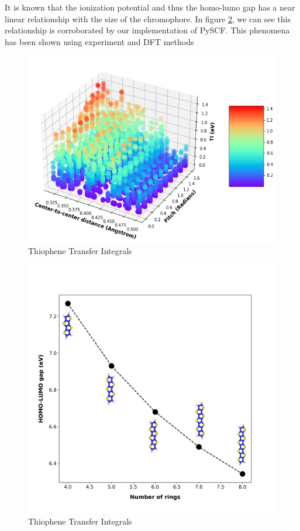 It is known that the ionization potential and thus the homo-lumo gap has a near linear relationship with the
size of the chromophore. In figure \ref{fig:fused}, we can see this relationship is corroborated by our
implementation of PySCF. This phenomena has been shown using experiment and DFT methods  \cite{Arago2010}


\begin{figure}
  \center
  \includegraphics[width=0.8\linewidth]{figures/transfer_integral_plot.png}
  \caption{Thiophene Transfer Integrals}
  \label{fig:TI}
\end{figure}
\begin{figure}
  \center
  \includegraphics[width=0.8\linewidth]{figures/fused-ring-figure.png}
  \caption{Thiophene Transfer Integrals}
  \label{fig:fused}
\end{figure}


